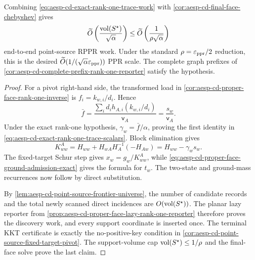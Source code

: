 \begin{corollary}
Combining \cref{eq:aesp-cd-exact-rank-one-trace-work} with
\cref{cor:aesp-cd-final-face-chebyshev} gives
\begin{equation*}
 \widetilde O\left(\frac{\operatorname{vol}(S^\star)}{\sqrt\alpha}\right)
 \leq\widetilde O\left(\frac1{\rho\sqrt\alpha}\right)
\end{equation*}
end-to-end point-source RPPR work.  Under the standard
\(\rho=\varepsilon_{\rm ppr}/2\) reduction, this is the desired
\(\widetilde O(1/(\sqrt\alpha\varepsilon_{\rm ppr}))\) PPR scale.  The complete
graph prefixes of
\cref{cor:aesp-cd-complete-prefix-rank-one-reporter} satisfy the hypothesis.
\end{corollary}

\begin{proof}
For a pivot right-hand side, the transformed load in
\cref{cor:aesp-cd-proper-face-rank-one-inverse} is
\(f_i=k_{w,i}/d_i\).  Hence
\begin{equation*}
 \bar f
 =\frac{\sum_i d_ih_{A,i}(k_{w,i}/d_i)}
        {\mathsf v_A}
 =\frac{s_w}{\mathsf v_A}.
\end{equation*}
Under the exact rank-one hypothesis,
\(\gamma_w=\bar f/\alpha\), proving the first identity in
\cref{eq:aesp-cd-exact-rank-one-trace-scalars}.  Block elimination gives
\begin{equation*}
 K^A_{ww}
 =H_{ww}+H_{wA}H_A^{-1}(-H_{Aw})
 =H_{ww}-\gamma_ws_w.
\end{equation*}
The fixed-target Schur step gives \(x_w=g_w/K^A_{ww}\), while
\cref{eq:aesp-cd-proper-face-ground-admission-exact} gives the formula for
\(t_w\).  The two-state and ground-mass recurrences now follow by direct
substitution.

By \cref{lem:aesp-cd-point-source-frontier-universe}, the number of candidate
records and the total newly scanned direct incidences are
\(O(\operatorname{vol}(S^\star))\).  The planar lazy reporter from
\cref{prop:aesp-cd-proper-face-lazy-rank-one-reporter} therefore proves the
discovery work, and every support coordinate is inserted once.  The terminal
KKT certificate is exactly the no-positive-key condition in
\cref{cor:aesp-cd-point-source-fixed-target-pivot}.  The support-volume cap
\(\operatorname{vol}(S^\star)\leq1/\rho\) and the final-face solve prove the last claim.
\end{proof}

